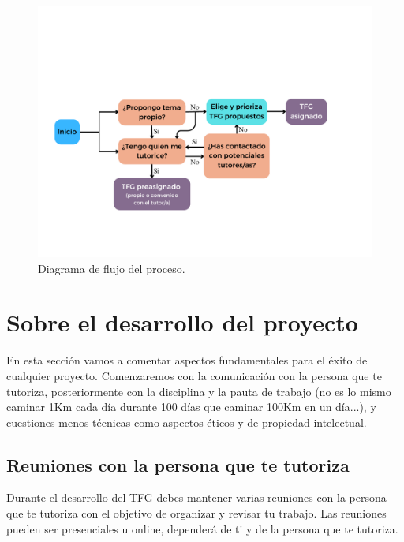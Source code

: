 \begin{figure}[!ht]
\centering
    \includegraphics[scale=0.5]{images/DecisionTFG.pdf}
    \caption{Diagrama de flujo del proceso.}\label{fg_diagrama_proceso}
\end{figure}


\section{Sobre el desarrollo del proyecto}


En esta sección vamos a comentar aspectos fundamentales para el éxito de cualquier proyecto. Comenzaremos con la comunicación con la persona que te tutoriza, posteriormente con la disciplina y la pauta de trabajo (no es lo mismo caminar 1Km cada día durante 100 días que caminar 100Km en un día...), y cuestiones menos técnicas como aspectos éticos y de propiedad intelectual.

\subsection{Reuniones con la persona que te tutoriza}%

Durante el desarrollo del TFG debes mantener varias reuniones con la persona que te tutoriza con el objetivo de organizar y revisar tu trabajo. Las reuniones pueden ser presenciales u online, dependerá de ti y de la persona que te tutoriza.

